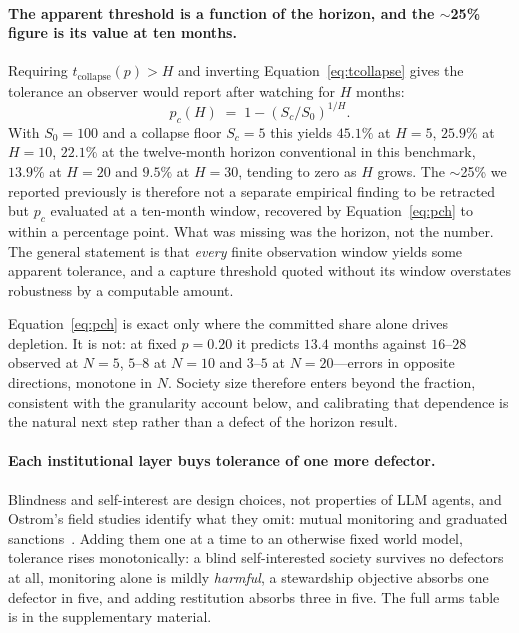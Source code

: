 \documentclass[manuscript,screen,review]{acmart}
\begin{document}
\paragraph{The apparent threshold is a function of the horizon, and the
$\sim$25\% figure is its value at ten months.} Requiring
$t_{\mathrm{collapse}}(p)>H$ and inverting Equation~\ref{eq:tcollapse} gives the
tolerance an observer would report after watching for $H$ months:
\begin{equation}
p_c(H) \;=\; 1-\left(S_c/S_0\right)^{1/H}.
\label{eq:pch}
\end{equation}
With $S_0{=}100$ and a collapse floor $S_c{=}5$ this yields $45.1\%$ at $H{=}5$,
$\mathbf{25.9\%}$ at $H{=}10$, $22.1\%$ at the twelve-month horizon conventional
in this benchmark, $13.9\%$ at $H{=}20$ and $9.5\%$ at $H{=}30$, tending to zero as
$H$ grows. The $\sim$25\% we reported previously is therefore not a separate
empirical finding to be retracted but $p_c$ evaluated at a ten-month window,
recovered by Equation~\ref{eq:pch} to within a percentage point. What was missing
was the horizon, not the number. The general statement is that \emph{every} finite
observation window yields some apparent tolerance, and a capture threshold quoted
without its window overstates robustness by a computable amount.

Equation~\ref{eq:pch} is exact only where the committed share alone drives
depletion. It is not: at fixed $p{=}0.20$ it predicts $13.4$ months against $16$--$28$
observed at $N{=}5$, $5$--$8$ at $N{=}10$ and $3$--$5$ at $N{=}20$---errors in
opposite directions, monotone in $N$. Society size therefore enters beyond the
fraction, consistent with the granularity account below, and calibrating that
dependence is the natural next step rather than a defect of the horizon result.

\paragraph{Each institutional layer buys tolerance of one more defector.}
Blindness and self-interest are design choices, not properties of LLM agents, and
Ostrom's field studies identify what they omit: mutual monitoring and graduated
sanctions~\cite{ostrom1990}. Adding them one at a time to an otherwise fixed world
model, tolerance rises monotonically: a blind self-interested society survives no
defectors at all, monitoring alone is mildly \emph{harmful}, a stewardship
objective absorbs one defector in five, and adding restitution absorbs three in
five. The full arms table is in the supplementary material.
\end{document}
